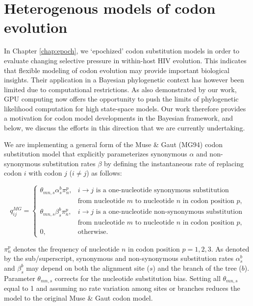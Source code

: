 \section{Heterogenous models of codon evolution\label{sub:dpp}}


In Chapter \ref{chap:epoch}, we `epochized' codon substitution models in order to evaluate changing selective pressure in within-host HIV evolution. 
This indicates that flexible modeling of codon evolution may provide important biological insights. 
Their application in a Bayesian phylogenetic context has however been limited due to computational restrictions. 
As also demonstrated by our work, GPU computing now offers the opportunity to push the limits of phylogenetic likelihood computation for high state-space models. 
Our work therefore provides a motivation for codon model developments in the Bayesian framework, and below, we discuss the efforts in this direction that we are currently undertaking.

We are implementing a general form of the Muse \& Gaut (MG94) codon substitution model \citep{Muse1994} that explicitly parameterizes synonymous $\alpha$ and non-synonymous substitution rates $\beta$ by defining the instantaneous rate of replacing codon $i$ with codon $j$ ($i \neq j$) as follows:

\begin{displaymath}
q_{ij}^{MG} = \begin{cases} \theta_{mn,s}\alpha_{s}^{b}\pi_{n}^{p}, & i \to j \text{ is a one-nucleotide synonymous substitution} \\ & \text{from nucleotide $m$ to nucleotide $n$ in codon position $p$,} \\ \theta_{mn,s}\beta_{s}^{b}\pi_{n}^{p}, & i \to j \text{ is a one-nucleotide non-synonymous substitution} \\ & \text{from nucleotide $m$ to nucleotide $n$ in codon position $p$,} \\ 0, & \text{otherwise.} \end{cases}
\end{displaymath}

$\pi_{n}^{p}$ denotes the frequency of nucleotide $n$ in codon position $p = 1,2,3$. 
As denoted by the sub/superscript, synonymous and non-synonymous substitution rates $\alpha_{s}^{b}$ and  $\beta_{s}^{b}$ may depend on both the alignment site ($s$) and the branch of the tree ($b$). 
Parameter $\theta_{mn,s}$ corrects for the nucleotide substitution bias. 
Setting all $\theta_{mn,s}$ equal to 1 and assuming no rate variation among sites or branches reduces the model to the original Muse \& Gaut codon model.%

